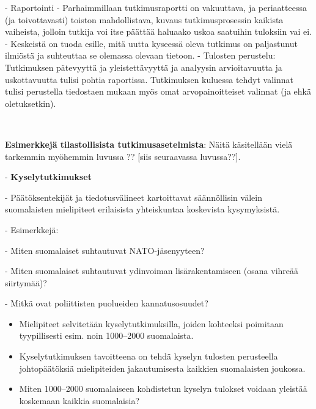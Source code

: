 \documentclass[
]{book}
\begin{document}
\begin{itemize}
- Raportointi
  - Parhaimmillaan tutkimusraportti on vakuuttava, ja periaatteessa (ja toivottavasti) toiston mahdollistava, kuvaus tutkimusprosessin kaikista vaiheista, jolloin tutkija voi itse päättää haluaako uskoa saatuihin tuloksiin vai ei.
  - Keskeistä on tuoda esille, mitä uutta kyseessä oleva tutkimus on paljastunut ilmiöstä ja suhteuttaa se olemassa olevaan tietoon.
  - Tulosten perustelu: Tutkimuksen pätevyyttä ja yleistettävyyttä ja analyysin arvioitavuutta ja uskottavuutta tulisi pohtia raportissa. Tutkimuksen kuluessa tehdyt valinnat tulisi perustella tiedostaen mukaan myös omat arvopainoitteiset valinnat (ja ehkä oletuksetkin).

\
\

\textbf{Esimerkkejä tilastollisista tutkimusasetelmista}: Näitä käsitellään vielä tarkemmin myöhemmin luvussa ?? [siis seuraavassa luvussa??].

\begin{itemize}

- \textbf{Kyselytutkimukset}

\begin{itemize}

- Päätöksentekijät ja tiedotusvälineet kartoittavat säännöllisin välein suomalaisten mielipiteet erilaisista yhteiskuntaa koskevista kysymyksistä.

- Esimerkkejä:

\begin{itemize}

- Miten suomalaiset suhtautuvat NATO-jäsenyyteen?

- Miten suomalaiset suhtautuvat ydinvoiman lisärakentamiseen (osana vihreää siirtymää)?

- Mitkä ovat poliittisten puolueiden kannatusosuudet?

\end{itemize}

\begin{itemize}
\item
  Mielipiteet selvitetään kyselytutkimuksilla, joiden kohteeksi poimitaan tyypillisesti esim. noin 1000--2000 suomalaista.
\item
  Kyselytutkimuksen tavoitteena on tehdä kyselyn tulosten perusteella johtopäätöksiä mielipiteiden jakautumisesta kaikkien suomalaisten joukossa.
\item
  Miten 1000--2000 suomalaiseen kohdistetun kyselyn tulokset voidaan yleistää koskemaan kaikkia suomalaisia?
\end{itemize}


\end{itemize}
\end{itemize}
\end{itemize}
\end{document}
